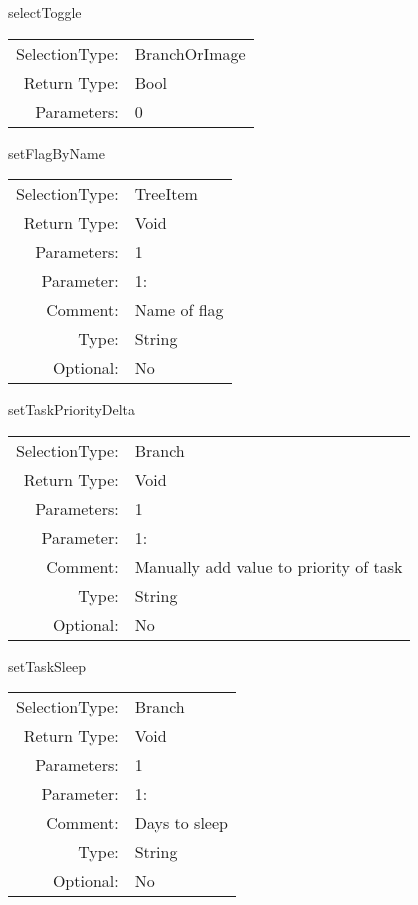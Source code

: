 \item selectToggle\\
\begin{tabular}{rl}
  SelectionType: & BranchOrImage\\
    Return Type: & Bool\\
     Parameters: & 0\\
\end{tabular}

\item setFlagByName\\
\begin{tabular}{rl}
  SelectionType: & TreeItem\\
    Return Type: & Void\\
     Parameters: & 1\\
   Parameter: &  1:\\
        Comment: & Name of flag\\
           Type: & String\\
       Optional: &  No\\
\end{tabular}

\item setTaskPriorityDelta\\
\begin{tabular}{rl}
  SelectionType: & Branch\\
    Return Type: & Void\\
     Parameters: & 1\\
   Parameter: &  1:\\
        Comment: & Manually add value to priority of task\\
           Type: & String\\
       Optional: &  No\\
\end{tabular}

\item setTaskSleep\\
\begin{tabular}{rl}
  SelectionType: & Branch\\
    Return Type: & Void\\
     Parameters: & 1\\
   Parameter: &  1:\\
        Comment: & Days to sleep\\
           Type: & String\\
       Optional: &  No\\
\end{tabular}

